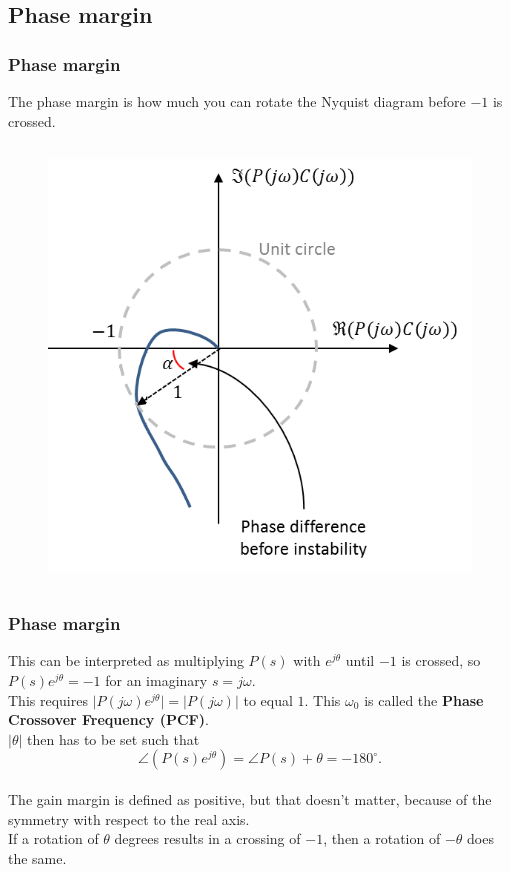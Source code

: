 \subsection{Phase margin}

\begin{frame}
	\frametitle{Phase margin}
	The phase margin is how much you can rotate the Nyquist diagram before $-1$ is crossed.
	\vspace{-3ex}
	\begin{columns}
		
		\begin{figure}
			\includegraphics[width=0.6\linewidth]{phase_margin}
		\end{figure}
	\end{columns}
\end{frame}

\begin{frame}
	\frametitle{Phase margin}
	This can be interpreted as multiplying $P(s)$ with $e^{j\theta}$ until $-1$ is crossed, so $P(s)e^{j\theta}=-1$ for an imaginary $s=j\omega$.\\
	\medskip
	This requires $\big|P(j\omega)e^{j\theta}\big|=\big|P(j\omega)\big|$ to equal $1$. This $\omega_0$ is called the \textbf{Phase Crossover Frequency (PCF)}.\\
	$\big|\theta\big|$ then has to be set such that $$\angle(P(s)e^{j\theta})=\angle P(s) + \theta = -180^{\circ}.$$\\
	The gain margin is defined as positive, but that doesn't matter, because of the symmetry with respect to the real axis.\\
	If a rotation of $\theta$ degrees results in a crossing of $-1$, then a rotation of $-\theta$ does the same.
\end{frame}

